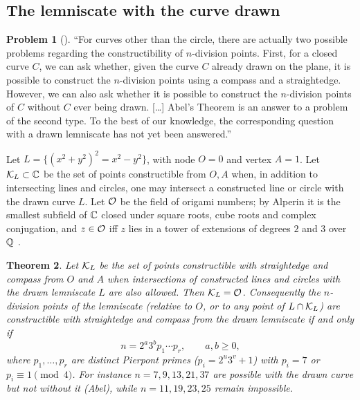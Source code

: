 \documentclass[11pt]{amsart}
\newtheorem{theorem}{Theorem}[section]
\theoremstyle{definition}
\newtheorem{problem}[theorem]{Problem}
\theoremstyle{remark}
\begin{document}
\subsection{The lemniscate with the curve drawn}
\label{R7-ssec-drawn}

\begin{problem}[{\cite[Remark~1.4]{R7-MRS16}}]\label{R7-prob-drawn}
``For curves other than the circle, there are actually two possible problems
regarding the constructibility of $n$-division points. First, for a closed
curve $C$, we can ask whether, given the curve $C$ already drawn on the
plane, it is possible to construct the $n$-division points using a compass
and a straightedge. However, we can also ask whether it is possible to
construct the $n$-division points of $C$ without $C$ ever being drawn.
[\dots] Abel's Theorem is an answer to a problem of the second type. To the
best of our knowledge, the corresponding question with a drawn lemniscate has
not yet been answered.''
\end{problem}

Let $L=\{(x^2+y^2)^2=x^2-y^2\}$, with node $O=0$ and vertex $A=1$. Let
$\mathcal{K}_L\subset\mathbb{C}$ be the set of points constructible from $O,A$ when, in
addition to intersecting lines and circles, one may intersect a constructed
line or circle with the drawn curve $L$. Let $\mathcal{O}$ be the field of origami
numbers; by Alperin \cite[Theorem~5.2]{R7-Alperin00} it is the smallest
subfield of $\mathbb{C}$ closed under square roots, cube roots and complex
conjugation, and $z\in\mathcal{O}$ iff $z$ lies in a tower of extensions of degrees
$2$ and $3$ over $\mathbb{Q}$ \cite[Section~10.3]{R7-CoxGalois}.

\begin{theorem}\label{R7-thm-drawn}
Let $\mathcal{K}_L$ be the set of points constructible with straightedge and
compass from $O$ and $A$ when intersections of constructed lines and circles
with the drawn lemniscate $L$ are also allowed. Then $\mathcal{K}_L=\mathcal{O}$. Consequently the $n$-division points of the lemniscate
(relative to $O$, or to any point of $L\cap\mathcal{K}_L$) are constructible with
straightedge and compass from the drawn lemniscate if and only if
\[
 n=2^a3^bp_1\cdots p_r,\qquad a,b\ge0,
\]
where $p_1,\dots,p_r$ are distinct Pierpont primes ($p_i=2^u3^v+1$) with
$p_i=7$ or $p_i\equiv1\pmod 4$. For instance $n=7,9,13,21,37$ are possible
with the drawn curve but not without it (Abel), while $n=11,19,23,25$ remain
impossible.
\end{theorem}
\end{document}
